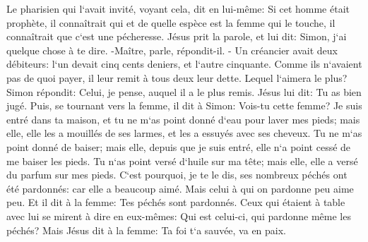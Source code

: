 \verse Le pharisien qui l`avait invité, voyant cela, dit en lui-même: Si cet homme était prophète, il connaîtrait qui et de quelle espèce est la femme qui le touche, il connaîtrait que c`est une pécheresse. 
\verse Jésus prit la parole, et lui dit: Simon, j`ai quelque chose à te dire. -Maître, parle, répondit-il. - 
\verse Un créancier avait deux débiteurs: l`un devait cinq cents deniers, et l`autre cinquante. 
\verse Comme ils n`avaient pas de quoi payer, il leur remit à tous deux leur dette. Lequel l`aimera le plus? 
\verse Simon répondit: Celui, je pense, auquel il a le plus remis. Jésus lui dit: Tu as bien jugé. 
\verse Puis, se tournant vers la femme, il dit à Simon: Vois-tu cette femme? Je suis entré dans ta maison, et tu ne m`as point donné d`eau pour laver mes pieds; mais elle, elle les a mouillés de ses larmes, et les a essuyés avec ses cheveux. 
\verse Tu ne m`as point donné de baiser; mais elle, depuis que je suis entré, elle n`a point cessé de me baiser les pieds. 
\verse Tu n`as point versé d`huile sur ma tête; mais elle, elle a versé du parfum sur mes pieds. 
\verse C`est pourquoi, je te le dis, ses nombreux péchés ont été pardonnés: car elle a beaucoup aimé. Mais celui à qui on pardonne peu aime peu. 
\verse Et il dit à la femme: Tes péchés sont pardonnés. 
\verse Ceux qui étaient à table avec lui se mirent à dire en eux-mêmes: Qui est celui-ci, qui pardonne même les péchés? 
\verse Mais Jésus dit à la femme: Ta foi t`a sauvée, va en paix. 

